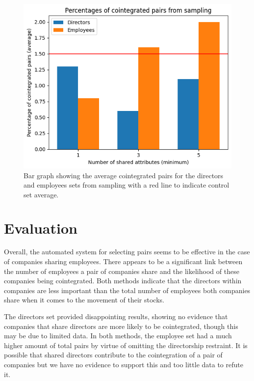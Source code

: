 \documentclass{UoYCSproject}
\begin{document}
\begin{figure}[t]
\begin{center}
\includegraphics[scale=0.7]{"./images/sampling"}
\end{center}
\caption{Bar graph showing the average cointegrated pairs for the directors and employees sets from sampling with a red line to indicate control set average.}
\end{figure}

\section{Evaluation}

Overall, the automated system for selecting pairs seems to be effective in the case of companies sharing employees. There appears to be a significant link between the number of employees a pair of companies share and the likelihood of these companies being cointegrated. Both methods indicate that the directors within companies are less important than the total number of employees both companies share when it comes to the movement of their stocks.

The directors set provided disappointing results, showing no evidence that companies that share directors are more likely to be cointegrated, though this may be due to limited data. In both methods, the employee set had a much higher amount of total pairs by virtue of omitting the directorship restraint. It is possible that shared directors contribute to the cointegration of a pair of companies but we have no evidence to support this and too little data to refute it.
\end{document}
